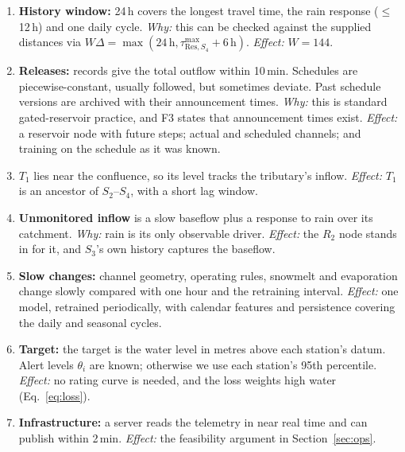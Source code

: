 \documentclass[11pt,a4paper]{article}
\newcommand{\Res}{\mathrm{Res}}
\begin{document}
\begin{enumerate}[label=\textbf{A\arabic*}, ref=A\arabic*, leftmargin=*]
  \item \textbf{History window:} 24\,h covers the longest travel time, the rain
  response ($\le$12\,h) and one daily cycle. \emph{Why:} this can be checked
  against the supplied distances via
  $W\Delta=\max(24\,\mathrm{h},\tau^{\max}_{\Res,S_4}+6\,\mathrm{h})$.
  \emph{Effect:} $W=144$.

  \item \textbf{Releases:} records give the total outflow within 10\,min.
  Schedules are piecewise-constant, usually followed, but sometimes deviate.
  Past schedule versions are archived with their announcement times.
  \emph{Why:} this is standard gated-reservoir practice, and F3 states that
  announcement times exist. \emph{Effect:} a reservoir node with future steps;
  actual and scheduled channels; and training on the schedule as it was known.

  \item \textbf{$T_1$} lies near the confluence, so its level tracks the
  tributary's inflow. \emph{Effect:} $T_1$ is an ancestor of $S_2$--$S_4$,
  with a short lag window.

  \item \textbf{Unmonitored inflow} is a slow baseflow plus a response to rain
  over its catchment. \emph{Why:} rain is its only observable driver.
  \emph{Effect:} the $R_2$ node stands in for it, and $S_3$'s own history
  captures the baseflow.

  \item \textbf{Slow changes:} channel geometry, operating rules, snowmelt and
  evaporation change slowly compared with one hour and the retraining
  interval. \emph{Effect:} one model, retrained periodically, with calendar
  features and persistence covering the daily and seasonal cycles.

  \item \textbf{Target:} the target is the water level in metres above each
  station's datum. Alert levels $\theta_i$ are known; otherwise we use each
  station's 95th percentile. \emph{Effect:} no rating curve is needed, and the
  loss weights high water (Eq.~\ref{eq:loss}).

  \item \textbf{Infrastructure:} a server reads the telemetry in near real time
  and can publish within 2\,min. \emph{Effect:} the feasibility argument in
  Section~\ref{sec:ops}.
\end{enumerate}

\end{document}
